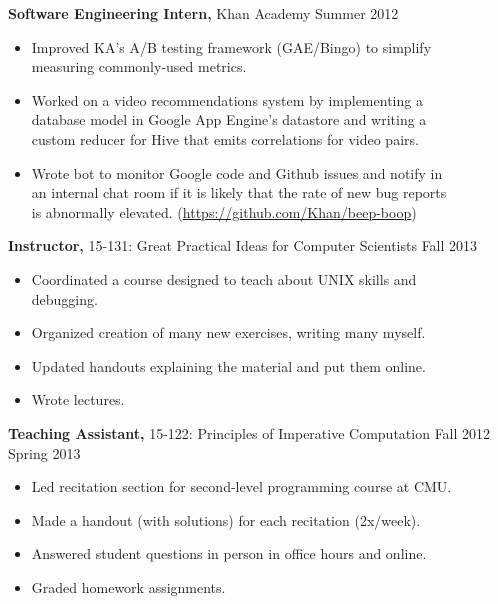 \documentclass[margin]{res}
\begin{document}
\begin{resume}
{\bf Software Engineering Intern,} Khan Academy \hfill Summer 2012
\begin{itemize} \itemsep -2pt %
\item Improved KA's A/B testing framework (GAE/Bingo) to simplify\\
    measuring commonly-used metrics.
\item Worked on a video recommendations system by implementing a \\
    database model in Google App Engine's datastore and writing a \\
    custom reducer for Hive that emits correlations for video pairs.
\item Wrote bot to monitor Google code and Github issues and notify in \\
    an internal chat room if it is likely that the rate of new bug reports \\
    is abnormally elevated.
    (\href{https://github.com/Khan/beep-boop}{https://github.com/Khan/beep-boop})
\end{itemize}

{\bf Instructor,} 15-131: Great Practical Ideas for Computer Scientists \hfill
Fall 2013
\begin{itemize} \itemsep -2pt
  \item Coordinated a course designed to teach about UNIX skills and \\
      debugging.
  \item Organized creation of many new exercises, writing many myself.
  \item Updated handouts explaining the material and put them online.
  \item Wrote lectures.
\end{itemize}

{\bf Teaching Assistant,} 15-122: Principles of Imperative Computation \hfill
Fall 2012\\ \hphantom{1em} \hfill Spring 2013

\vspace{-1em}\vspace{-1ex}
\begin{itemize} \itemsep -2pt
  \item Led recitation section for second-level programming course at CMU.
  \item Made a handout (with solutions) for each recitation (2x/week).
  \item Answered student questions in person in office hours and online.
  \item Graded homework assignments.
\end{itemize}


\end{resume}
\end{document}

